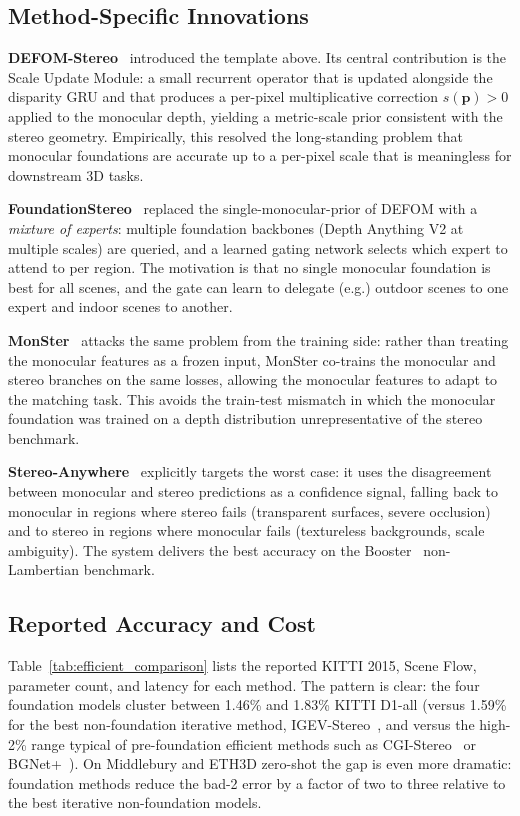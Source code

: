\subsection{Method-Specific Innovations}

\textbf{DEFOM-Stereo}~\cite{jiang2025defom} introduced the template above. Its central contribution is the Scale Update Module: a small recurrent operator that is updated alongside the disparity GRU and that produces a per-pixel multiplicative correction $s(\mathbf{p}) > 0$ applied to the monocular depth, yielding a metric-scale prior consistent with the stereo geometry. Empirically, this resolved the long-standing problem that monocular foundations are accurate up to a per-pixel scale that is meaningless for downstream 3D tasks.

\textbf{FoundationStereo}~\cite{wen2025foundationstereo} replaced the single-monocular-prior of DEFOM with a \emph{mixture of experts}: multiple foundation backbones (Depth Anything V2 at multiple scales) are queried, and a learned gating network selects which expert to attend to per region. The motivation is that no single monocular foundation is best for all scenes, and the gate can learn to delegate (e.g.) outdoor scenes to one expert and indoor scenes to another.

\textbf{MonSter}~\cite{cheng2025monster} attacks the same problem from the training side: rather than treating the monocular features as a frozen input, MonSter co-trains the monocular and stereo branches on the same losses, allowing the monocular features to adapt to the matching task. This avoids the train-test mismatch in which the monocular foundation was trained on a depth distribution unrepresentative of the stereo benchmark.

\textbf{Stereo-Anywhere}~\cite{bartolomei2025stereoanywhere} explicitly targets the worst case: it uses the disagreement between monocular and stereo predictions as a confidence signal, falling back to monocular in regions where stereo fails (transparent surfaces, severe occlusion) and to stereo in regions where monocular fails (textureless backgrounds, scale ambiguity). The system delivers the best accuracy on the Booster~\cite{ramirez2022booster} non-Lambertian benchmark.

\subsection{Reported Accuracy and Cost}

Table~\ref{tab:efficient_comparison} lists the reported KITTI 2015, Scene Flow, parameter count, and latency for each method. The pattern is clear: the four foundation models cluster between 1.46\% and 1.83\% KITTI D1-all (versus 1.59\% for the best non-foundation iterative method, IGEV-Stereo~\cite{xu2023igev}, and versus the high-2\% range typical of pre-foundation efficient methods such as CGI-Stereo~\cite{xu2023cgistereo} or BGNet+~\cite{xu2021bgnet}). On Middlebury and ETH3D zero-shot the gap is even more dramatic: foundation methods reduce the bad-2 error by a factor of two to three relative to the best iterative non-foundation models.

